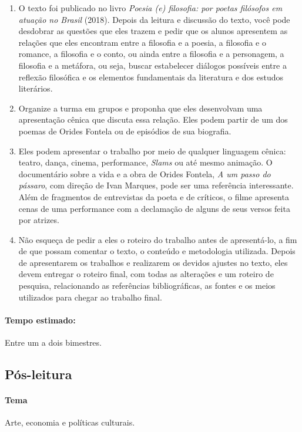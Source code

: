\documentclass[12pt]{extarticle}
\begin{document}
\begin{enumerate}
\item O texto foi publicado no livro \emph{Poesia (e) filosofia: por poetas
filósofos em atuação no Brasil} (2018). Depois da leitura e discussão do
texto, você pode desdobrar as questões que eles trazem e pedir que os
alunos apresentem as relações que eles encontram entre a filosofia e a
poesia, a filosofia e o romance, a filosofia e o conto, ou ainda entre a
filosofia e a personagem, a filosofia e a metáfora, ou seja, buscar
estabelecer diálogos possíveis entre a reflexão filosófica e os
elementos fundamentais da literatura e dos estudos literários.

\item Organize a turma em grupos e proponha que eles desenvolvam uma
apresentação cênica que discuta essa relação. Eles podem partir de um
dos poemas de Orides Fontela ou de episódios de sua biografia.

\item Eles podem apresentar o trabalho por meio de qualquer linguagem
cênica: teatro, dança, cinema, performance, \emph{Slams} ou até mesmo
animação. O documentário sobre a vida e a obra de Orides Fontela,
\emph{A um passo do pássaro}, com direção de Ivan Marques, pode ser uma
referência interessante. Além de fragmentos de entrevistas da poeta e de
críticos, o filme apresenta cenas de uma performance com a declamação de
alguns de seus versos feita por atrizes.

\item Não esqueça de pedir a eles o roteiro do trabalho antes de
apresentá-lo, a fim de que possam comentar o texto, o conteúdo e
metodologia utilizada. Depois de apresentarem os trabalhos e realizarem
os devidos ajustes no texto, eles devem entregar o roteiro final, com
todas as alterações e um roteiro de pesquisa, relacionando as
referências bibliográficas, as fontes e os meios utilizados para chegar
ao trabalho final.
\end{enumerate}

\paragraph{Tempo estimado:} Entre um a dois bimestres.

\subsection{Pós-leitura}

\paragraph{Tema} Arte, economia e políticas culturais.
\end{document}
